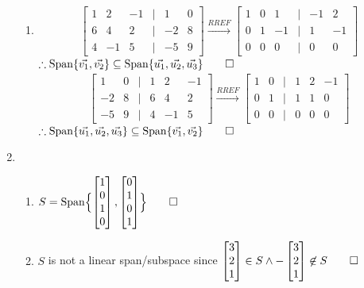 \documentclass[12pt, a4paper]{article}
\begin{document}
\begin{enumerate}[Q\arabic*.]
\begin{enumerate}[(\alph*)]
      \item 
        \begin{align*}
          \begin{bmatrix}
            1&2&-1&|&1&0\\
            6&4&2&|&-2&8\\
            4&-1&5&|&-5&9
          \end{bmatrix}\xrightarrow{RREF}
          \begin{bmatrix}
            1&0&1&|&-1&2\\
            0&1&-1&|&1&-1\\
            0&0&0&|&0&0
          \end{bmatrix}
        \end{align*}
        $\therefore \operatorname{Span}\{\vec{v_1}, \vec{v_2}\} \subseteq \operatorname{Span}\{\vec{u_1}, \vec{u_2}, \vec{u_3}\} \qed$
        \begin{align*}
          \begin{bmatrix}
            1&0&|&1&2&-1\\
            -2&8&|&6&4&2\\
            -5&9&|&4&-1&5
          \end{bmatrix}\xrightarrow{RREF}
          \begin{bmatrix}
            1&0&|&1&2&-1\\
            0&1&|&1&1&0\\
            0&0&|&0&0&0
          \end{bmatrix}
        \end{align*}
        $\therefore \operatorname{Span}\{\vec{u_1}, \vec{u_2}, \vec{u_3}\} \subseteq \operatorname{Span}\{\vec{v_1}, \vec{v_2}\} \qed$
    \end{enumerate}
  \pagebreak
  \item
    \begin{enumerate}[(\alph*)]
      \item $S = \operatorname{Span}\Bigl\{\begin{bmatrix}1\\0\\1\\0\end{bmatrix}, \begin{bmatrix}0\\1\\0\\1\end{bmatrix} \Bigr\} \qed$
      \item $S$ is not a linear span/subspace since $\begin{bmatrix}3\\2\\1\end{bmatrix} \in S \land -\begin{bmatrix}3\\2\\1\end{bmatrix} \not\in S \qed$

\end{enumerate}
\end{enumerate}
\end{document}
